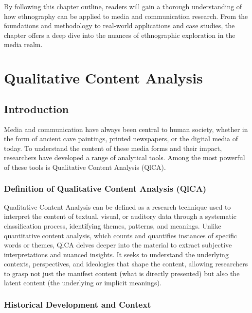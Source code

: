 \documentclass[
  b5paper]{book}
\begin{document}
By following this chapter outline, readers will gain a thorough understanding of how ethnography can be applied to media and communication research. From the foundations and methodology to real-world applications and case studies, the chapter offers a deep dive into the nuances of ethnographic exploration in the media realm.

\hypertarget{qualitative-content-analysis-1}{%
\chapter{Qualitative Content Analysis}\label{qualitative-content-analysis-1}}

\hypertarget{introduction-3}{%
\section{Introduction}\label{introduction-3}}

Media and communication have always been central to human society, whether in the form of ancient cave paintings, printed newspapers, or the digital media of today. To understand the content of these media forms and their impact, researchers have developed a range of analytical tools. Among the most powerful of these tools is Qualitative Content Analysis (QlCA).

\hypertarget{definition-of-qualitative-content-analysis-qlca}{%
\subsection*{Definition of Qualitative Content Analysis (QlCA)}\label{definition-of-qualitative-content-analysis-qlca}}

Qualitative Content Analysis can be defined as a research technique used to interpret the content of textual, visual, or auditory data through a systematic classification process, identifying themes, patterns, and meanings. Unlike quantitative content analysis, which counts and quantifies instances of specific words or themes, QlCA delves deeper into the material to extract subjective interpretations and nuanced insights. It seeks to understand the underlying contexts, perspectives, and ideologies that shape the content, allowing researchers to grasp not just the manifest content (what is directly presented) but also the latent content (the underlying or implicit meanings).

\hypertarget{historical-development-and-context}{%
\subsection*{Historical Development and Context}\label{historical-development-and-context}}
\end{document}
